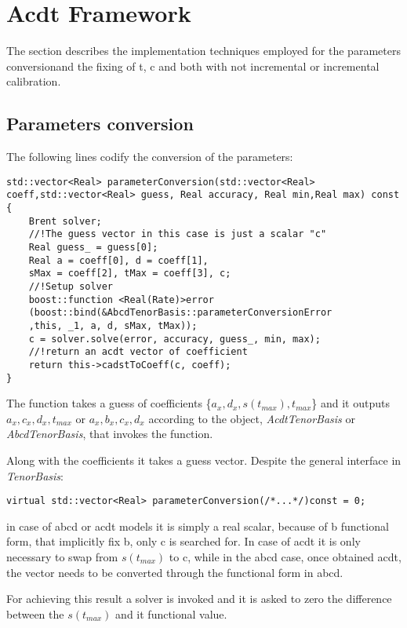 \chapter{Acdt Framework}
\label{chap:Acdt_framework}

The section describes the implementation techniques employed for the parameters conversionand the fixing of t, c and both with not incremental or incremental calibration.

\section{Parameters conversion}

The following lines codify the conversion of the parameters:

\begin{lstlisting}
std::vector<Real> parameterConversion(std::vector<Real> coeff,std::vector<Real> guess, Real accuracy, Real min,Real max) const 
{
	Brent solver;
    //!The guess vector in this case is just a scalar "c"
	Real guess_ = guess[0];
	Real a = coeff[0], d = coeff[1], 
	sMax = coeff[2], tMax = coeff[3], c;
	//!Setup solver
	boost::function <Real(Rate)>error
	(boost::bind(&AbcdTenorBasis::parameterConversionError
	,this, _1, a, d, sMax, tMax));
	c = solver.solve(error, accuracy, guess_, min, max);
	//!return an acdt vector of coefficient
	return this->cadstToCoeff(c, coeff); 
}
\end{lstlisting} 

The function takes a guess of coefficients \{$a_{x}, d_{x}, s(t_{max}), t_{max}$\} and it outputs {$a_{x}, c_{x}, d_{x}, t_{max}$} or {$a_{x}, b_{x}, c_{x}, d_{x}$} according to the object, \textit{AcdtTenorBasis} or \textit{AbcdTenorBasis}, that invokes the function. 

Along with the coefficients it takes a guess vector. 
Despite the general interface in \textit{TenorBasis}:

\begin{lstlisting}
virtual std::vector<Real> parameterConversion(/*...*/)const = 0;
 \end{lstlisting}   
 
in case of abcd or acdt models it is simply a real scalar, because of b functional form, that implicitly fix b, only c is searched for.
In case of acdt it is only necessary to swap from $s(t_{max})$ to c, while in the abcd case, once obtained acdt, the vector needs to be converted through the functional form in abcd.

For achieving this result a solver is invoked and it is asked to zero the difference between the $s(t_{max})$ and it functional value.

